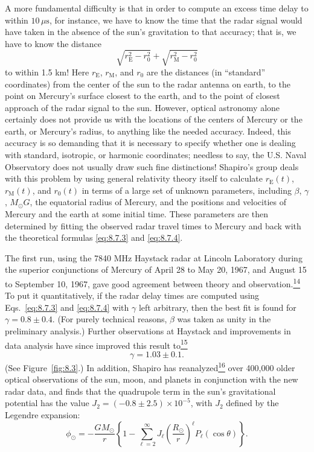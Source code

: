 A more fundamental difficulty is that in order to compute an excess time
delay to within \(10\,\mu\mathrm{s}\), for instance, we have to know the
time that the radar signal would have taken in the absence of the sun's
gravitation to that accuracy; that is, we have to know the distance
\[
  \sqrt{r_{\mathrm E}^2-r_0^2}
  +\sqrt{r_{\mathrm M}^2-r_0^2}
\]
to within 1.5 km! Here \(r_{\mathrm E}\), \(r_{\mathrm M}\), and \(r_0\)
are the distances (in ``standard'' coordinates) from the center of the sun
to the radar antenna on earth, to the point on Mercury's surface closest
to the earth, and to the point of closest approach of the radar signal to
the sun. However, optical astronomy alone certainly does not provide us
with the locations of the centers of Mercury or the earth, or Mercury's
radius, to anything like the needed accuracy. Indeed, this accuracy is so
demanding that it is necessary to specify whether one is dealing with
standard, isotropic, or harmonic coordinates; needless to say, the U.S.
Naval Observatory does not usually draw such fine distinctions! Shapiro's
group deals with this problem by using general relativity theory itself to
calculate \(r_{\mathrm E}(t)\), \(r_{\mathrm M}(t)\), and \(r_0(t)\) in
terms of a large set of unknown parameters, including \(\beta\), \(\gamma\),
\(M_\odot G\), the equatorial radius of Mercury, and the positions and
velocities of Mercury and the earth at some initial time. These parameters
are then determined by fitting the observed radar travel times to Mercury
and back with the theoretical formulas \eqref{eq:8.7.3} and
\eqref{eq:8.7.4}.

The first run, using the 7840 MHz Haystack radar at Lincoln Laboratory
during the superior conjunctions of Mercury of April 28 to May 20, 1967,
and August 15 to September 10, 1967, gave good agreement between theory and
observation.\hyperref[ch8-ref-14]{\textsuperscript{14}} To put it
quantitatively, if the radar delay times are computed using
Eqs.~\eqref{eq:8.7.3} and \eqref{eq:8.7.4} with \(\gamma\) left
arbitrary, then the best fit is found for \(\gamma=0.8\pm0.4\). (For purely
technical reasons, \(\beta\) was taken as unity in the preliminary
analysis.) Further observations at Haystack and improvements in data
analysis have since improved this result
to\hyperref[ch8-ref-15]{\textsuperscript{15}}
\begin{equation}
  \gamma=1.03\pm0.1.
  \tag{8.7.7}\label{eq:8.7.7}
\end{equation}
(See Figure~\ref{fig:8.3}.) In addition, Shapiro has
reanalyzed\hyperref[ch8-ref-16]{\textsuperscript{16}} over 400,000 older
optical observations of the sun, moon, and planets in conjunction with the
new radar data, and finds that the quadrupole term in the sun's
gravitational potential has the value
\(J_2=(-0.8\pm2.5)\times10^{-5}\), with \(J_2\) defined by the Legendre
expansion:
\[
  \phi_\odot
  =
  -\frac{GM_\odot}{r}
  \left\{
    1-\sum_{\ell=2}^{\infty}
    J_\ell\left(\frac{R_\odot}{r}\right)^\ell
    P_\ell(\cos\theta)
  \right\}.
\]

